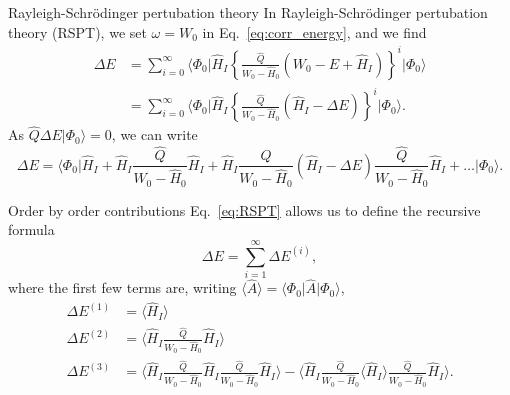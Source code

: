 \documentclass[UKenglish,aspectratio=169]{beamer}
\begin{document}
\begin{frame}{Rayleigh-Schrödinger pertubation theory}
    In Rayleigh-Schrödinger pertubation theory (RSPT), we set $\omega = W_0$ in Eq.~\eqref{eq:corr_energy}, and we find
    \begin{equation}
        \begin{split}
            \Delta E &= \sum_{i = 0}^\infty \Big\langle \Phi_0 \big\vert \hat{H}_I \left\{
                \frac{\hat{Q}}{W_0 - \hat{H}_0} \left( W_0 - E + \hat{H}_I \right)
            \right\}^{i} \big\lvert \Phi_0 \Big\rangle \\
            &= \sum_{i = 0}^\infty \Big\langle \Phi_0 \big\vert \hat{H}_I \left\{
                \frac{\hat{Q}}{W_0 - \hat{H}_0} \left( \hat{H}_I - \Delta E \right)
            \right\}^{i} \big\lvert \Phi_0 \Big\rangle.
        \end{split}
    \end{equation}
    As $\hat{Q} \Delta E \vert \Phi_0 \rangle = 0$, we can write
    \begin{equation}\label{eq:RSPT}
        \Delta E = \Big\langle \Phi_0 \big\vert
        \hat{H}_I
        + \hat{H}_I \frac{\hat{Q}}{W_0 - \hat{H}_0} \hat{H}_I
        + \hat{H}_I \frac{\hat{Q}}{W_0 - \hat{H}_0} \left( \hat{H}_I - \Delta E \right) \frac{\hat{Q}}{W_0 - \hat{H}_0} \hat{H}_I
        + \ldots
        \big\vert \Phi_0 \Big\rangle.
    \end{equation}
\end{frame}

\begin{frame}{Order by order contributions}
    Eq.~\eqref{eq:RSPT} allows us to define the recursive formula
    \begin{equation}
        \Delta E = \sum_{i = 1}^\infty \Delta E^{(i)},
    \end{equation}
    where the first few terms are, writing $\langle \hat{A} \rangle = \langle \Phi_0 \vert \hat{A} \vert \Phi_0 \rangle$,
    \begin{align}
        \Delta E^{(1)} &= \Big\langle \hat{H}_I \Big\rangle \\
        \Delta E^{(2)} &= \Big\langle \hat{H}_I \frac{\hat{Q}}{W_0 - \hat{H}_0} \hat{H}_I \Big\rangle \\
        \Delta E^{(3)} &=
        \Big\langle
        \hat{H}_I \frac{\hat{Q}}{W_0 - \hat{H}_0}
        \hat{H}_I \frac{\hat{Q}}{W_0 - \hat{H}_0}
        \hat{H}_I
        \Big\rangle
        - \Big\langle
        \hat{H}_I \frac{\hat{Q}}{W_0 - \hat{H}_0}
        \Big\langle \hat{H}_I \Big\rangle
        \frac{\hat{Q}}{W_0 - \hat{H}_0} \hat{H}_I
        \Big\rangle.
    \end{align}
\end{frame}
\end{document}
